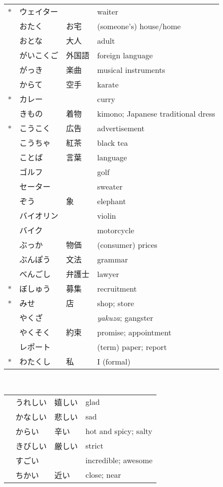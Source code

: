 \documentclass[notoc,notitlepage]{tufte-book}
\begin{document}
\begin{tabular}{r l l l}
  *  & ウェイター &        & waiter \\
     & おたく     & お宅   & (someone's) house/home \\
     & おとな     & 大人   & adult \\
     & がいこくご & 外国語 & foreign language \\
     & がっき     & 楽曲   & musical instruments \\
     & からて     & 空手   & karate \\
  *  & カレー     &        & curry \\
     & きもの     & 着物   & kimono; Japanese traditional dress \\
  *  & こうこく   & 広告   & advertisement \\
     & こうちゃ   & 紅茶   & black tea \\
     & ことば     & 言葉   & language \\
     & ゴルフ     &        & golf \\
     & セーター   &        & sweater \\
     & ぞう       & 象     & elephant \\
     & バイオリン &        & violin \\
     & バイク     &        & motorcycle \\
     & ぶっか     & 物価   & (consumer) prices \\
     & ぶんぽう   & 文法   & grammar \\
     & べんごし   & 弁護士 & lawyer \\
  *  & ぼしゅう   & 募集   & recruitment \\
  *  & みせ       & 店     & shop; store \\
     & やくざ     &        & \textit{yakuza}; gangster \\
     & やくそく   & 約束   & promise; appointment \\
     & レポート   &        & (term) paper; report \\
  *  & わたくし   & 私     & I (formal)
\end{tabular}

 \\
\begin{tabular}{r l l l}
   & うれしい & 嬉しい & glad \\
   & かなしい & 悲しい & sad \\
   & からい   & 辛い   & hot and spicy; salty \\
   & きびしい & 厳しい & strict \\
   & すごい   &        & incredible; awesome \\
   & ちかい   & 近い   & close; near
\end{tabular}
\end{document}

